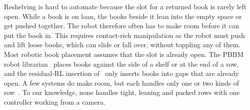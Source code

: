 \documentclass{article}
\begin{document}
Reshelving is hard to automate because the slot for a returned book is rarely left open. While a book is
on loan, the books beside it lean into the empty space or get pushed together. The robot therefore often
has to make room before it can put the book in. This requires contact-rich manipulation as the robot must push
and lift loose books, which can slide or fall over, without toppling any of them. Most robotic book placement assumes
that the slot is already open. The PBBM robot librarian~\citep{sygo2023pbbm} places books against the side
of a shelf or at the end of a row, and the residual-RL insertion of~\citet{liu2026residual} only inserts
books into gaps that are already open. A few systems do make room, but each handles only one or two kinds of
row~\citep{nakajima2011book, ishida2011arranging, yang2024haptic}. To our knowledge, none handles tight,
leaning and packed rows with one controller working from a camera.
\end{document}
